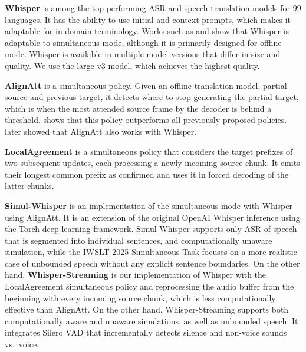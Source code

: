\documentclass[11pt]{article}
\begin{document}
\def\highlighted#1{\textbf{#1}}


\highlighted{Whisper} is among the top-performing ASR and speech translation models for 99 languages. It has the ability to use initial and context prompts, which makes it adaptable for in-domain terminology. Works such as \citet{machacek-etal-2023-turning} and \citet{simul-whisper} show that Whisper is adaptable to simultaneous mode, although it is primarily designed for offline mode. 
Whisper is available in multiple model versions that differ in size and quality. We use the large-v3 model, which achieves the highest quality.

\highlighted{AlignAtt} \cite{papi23_interspeech} is a simultaneous policy. Given an offline translation model, partial source and previous target, it detects where to stop generating the partial target, which is when the most attended source frame by the decoder is behind a threshold. \citet{papi23_interspeech} shows that this policy outperforms all previously proposed policies. \citet{simul-whisper} later showed that AlignAtt also works with Whisper. 

\highlighted{LocalAgreement} \cite{polak-etal-2022-cuni,polak23_interspeech} is a simultaneous policy that considers the target prefixes of two subsequent updates, each processing a newly incoming source chunk. It emits their longest common prefix as confirmed and uses it in forced decoding of the latter chunks.

\highlighted{Simul-Whisper} \cite{simul-whisper} is an implementation of the simultaneous mode with Whisper using AlignAtt. It is an extension of the original OpenAI Whisper inference using the Torch deep learning framework. Simul-Whisper supports only ASR of speech that is segmented into individual sentences, and computationally unaware simulation, while the IWSLT 2025 Simultaneous Task focuses on a more realistic case of unbounded speech \cite{papi-etal-2024-how-real} without any explicit sentence boundaries. On the other hand, \highlighted{Whisper-Streaming} \cite{machacek-etal-2023-turning} is our implementation of Whisper with the LocalAgreement simultaneous policy and reprocessing the audio buffer from the beginning with every incoming source chunk, which is less computationally effective than AlignAtt. On the other hand, Whisper-Streaming supports both computationally aware and unaware simulations, as well as unbounded speech. It integrates Silero VAD \cite{Silero_VAD} that incrementally detects silence and non-voice sounds vs.\ voice.
\end{document}
